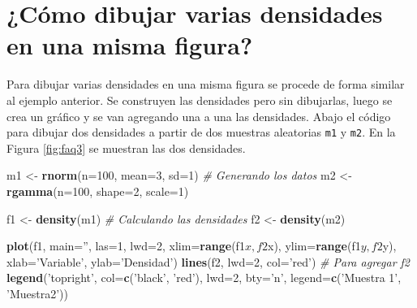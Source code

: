 \documentclass[10pt,]{krantz}
\makeatletter
\newenvironment{Shaded}{\begin{snugshade}}{\end{snugshade}}
\newcommand{\KeywordTok}[1]{\textcolor[rgb]{0.13,0.29,0.53}{\textbf{{#1}}}}
\newcommand{\DataTypeTok}[1]{\textcolor[rgb]{0.13,0.29,0.53}{{#1}}}
\newcommand{\DecValTok}[1]{\textcolor[rgb]{0.00,0.00,0.81}{{#1}}}
\newcommand{\StringTok}[1]{\textcolor[rgb]{0.31,0.60,0.02}{{#1}}}
\newcommand{\CommentTok}[1]{\textcolor[rgb]{0.56,0.35,0.01}{\textit{{#1}}}}
\newcommand{\NormalTok}[1]{{#1}}
\newenvironment{kframe}{%
\medskip{}
\setlength{\fboxsep}{.8em}
 \def\at@end@of@kframe{}%
 \ifinner\ifhmode%
  \def\at@end@of@kframe{\end{minipage}}%
  \begin{minipage}{\columnwidth}%
 \fi\fi%
 \def\FrameCommand##1{\hskip\@totalleftmargin \hskip-\fboxsep
 \colorbox{shadecolor}{##1}\hskip-\fboxsep
     \hskip-\linewidth \hskip-\@totalleftmargin \hskip\columnwidth}%
 \MakeFramed {\advance\hsize-\width
   \@totalleftmargin\z@ \linewidth\hsize
   \@setminipage}}%
 {\par\unskip\endMakeFramed%
 \at@end@of@kframe}
\renewenvironment{Shaded}{\begin{kframe}}{\end{kframe}}
\makeatother
\begin{document}
\section{¿Cómo dibujar varias densidades en una misma
figura?}\label{como-dibujar-varias-densidades-en-una-misma-figura}

Para dibujar varias densidades en una misma figura se procede de forma
similar al ejemplo anterior. Se construyen las densidades pero sin
dibujarlas, luego se crea un gráfico y se van agregando una a una las
densidades. Abajo el código para dibujar dos densidades a partir de dos
muestras aleatorias \texttt{m1} y \texttt{m2}. En la Figura
\ref{fig:faq3} se muestran las dos densidades.

\begin{Shaded}
\begin{Highlighting}[]
\NormalTok{m1 <-}\StringTok{ }\KeywordTok{rnorm}\NormalTok{(}\DataTypeTok{n=}\DecValTok{100}\NormalTok{, }\DataTypeTok{mean=}\DecValTok{3}\NormalTok{, }\DataTypeTok{sd=}\DecValTok{1}\NormalTok{)        }\CommentTok{# Generando los datos}
\NormalTok{m2 <-}\StringTok{ }\KeywordTok{rgamma}\NormalTok{(}\DataTypeTok{n=}\DecValTok{100}\NormalTok{, }\DataTypeTok{shape=}\DecValTok{2}\NormalTok{, }\DataTypeTok{scale=}\DecValTok{1}\NormalTok{)}

\NormalTok{f1 <-}\StringTok{ }\KeywordTok{density}\NormalTok{(m1)  }\CommentTok{# Calculando las densidades}
\NormalTok{f2 <-}\StringTok{ }\KeywordTok{density}\NormalTok{(m2)}

\KeywordTok{plot}\NormalTok{(f1, }\DataTypeTok{main=}\StringTok{''}\NormalTok{, }\DataTypeTok{las=}\DecValTok{1}\NormalTok{, }\DataTypeTok{lwd=}\DecValTok{2}\NormalTok{,}
     \DataTypeTok{xlim=}\KeywordTok{range}\NormalTok{(f1$x, f2$x), }\DataTypeTok{ylim=}\KeywordTok{range}\NormalTok{(f1$y, f2$y),}
     \DataTypeTok{xlab=}\StringTok{'Variable'}\NormalTok{, }\DataTypeTok{ylab=}\StringTok{'Densidad'}\NormalTok{)}
\KeywordTok{lines}\NormalTok{(f2, }\DataTypeTok{lwd=}\DecValTok{2}\NormalTok{, }\DataTypeTok{col=}\StringTok{'red'}\NormalTok{)  }\CommentTok{# Para agregar f2}
\KeywordTok{legend}\NormalTok{(}\StringTok{'topright'}\NormalTok{, }\DataTypeTok{col=}\KeywordTok{c}\NormalTok{(}\StringTok{'black'}\NormalTok{, }\StringTok{'red'}\NormalTok{),}
       \DataTypeTok{lwd=}\DecValTok{2}\NormalTok{, }\DataTypeTok{bty=}\StringTok{'n'}\NormalTok{, }\DataTypeTok{legend=}\KeywordTok{c}\NormalTok{(}\StringTok{'Muestra 1'}\NormalTok{, }\StringTok{'Muestra2'}\NormalTok{))}
\end{Highlighting}
\end{Shaded}
\end{document}

